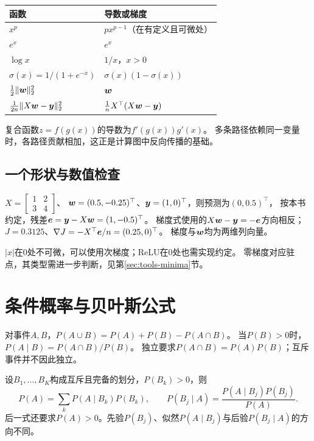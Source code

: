 \begin{center}
\begin{tabular}{ll}
\toprule
函数 & 导数或梯度\\
\midrule
$x^p$ & $p x^{p-1}$（在有定义且可微处）\\
$e^x$ & $e^x$\\
$\log x$ & $1/x$，$x>0$\\
$\sigma(x)=1/(1+e^{-x})$ & $\sigma(x)(1-\sigma(x))$\\
$\frac12\lVert\boldsymbol{w}\rVert_2^2$ & $\boldsymbol{w}$\\
$\frac1{2n}\lVert X\boldsymbol{w}-\boldsymbol{y}\rVert_2^2$ & $\frac1nX^\top(X\boldsymbol{w}-\boldsymbol{y})$\\
\bottomrule
\end{tabular}
\end{center}

复合函数$z=f(g(x))$的导数为$f'(g(x))g'(x)$。
多条路径依赖同一变量时，各路径贡献相加，这正是计算图中反向传播的基础。

\subsection{一个形状与数值检查}
$X=\left[\begin{smallmatrix}1&2\\3&4\end{smallmatrix}\right]$、
$\boldsymbol{w}=(0.5,-0.25)^\top$、$\boldsymbol{y}=(1,0)^\top$，则预测为$(0,0.5)^\top$，
按本书约定，残差$\boldsymbol{e}=\boldsymbol{y}-X\boldsymbol{w}=(1,-0.5)^\top$。
梯度式使用的$X\boldsymbol{w}-\boldsymbol{y}=-\boldsymbol{e}$方向相反；
$J=0.3125$、$\nabla J=-X^\top\boldsymbol{e}/n=(0.25,0)^\top$。
梯度与$\boldsymbol{w}$均为两维列向量。

\begin{pitfall}[不可微与零梯度]
$|x|$在0处不可微，可以使用次梯度；ReLU在0处也需实现约定。
零梯度对应驻点，其类型需进一步判断，见第\ref{sec:tools-minima}节。
\end{pitfall}

\section{条件概率与贝叶斯公式}
\label{sec:math-probability}
对事件$A,B$，$P(A\cup B)=P(A)+P(B)-P(A\cap B)$。
当$P(B)>0$时，$P(A\mid B)=P(A\cap B)/P(B)$。
独立要求$P(A\cap B)=P(A)P(B)$；互斥事件并不因此独立。

设$B_1,\ldots,B_K$构成互斥且完备的划分，$P(B_k)>0$，则
\[
 P(A)=\sum_kP(A\mid B_k)P(B_k),\qquad
 P(B_j\mid A)=\frac{P(A\mid B_j)P(B_j)}{P(A)}.
\]
后一式还要求$P(A)>0$。先验$P(B_j)$、似然$P(A\mid B_j)$与后验$P(B_j\mid A)$的方向不同。

